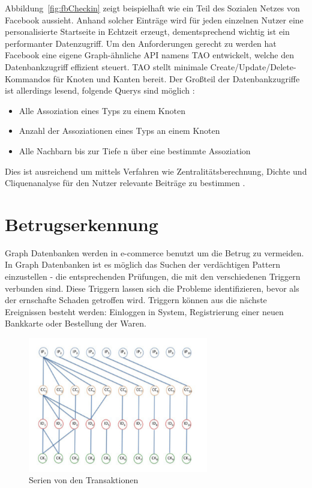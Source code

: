 Abbildung~\ref{fig:fbCheckin} zeigt beispielhaft wie ein Teil des Sozialen Netzes von Facebook aussieht. Anhand solcher Einträge wird für jeden einzelnen Nutzer eine personalisierte Startseite in Echtzeit erzeugt, dementsprechend wichtig ist ein performanter Datenzugriff. Um den Anforderungen gerecht zu werden hat Facebook eine eigene Graph-ähnliche API namens TAO entwickelt, welche den Datenbankzugriff effizient steuert. TAO stellt minimale Create/Update/Delete-Kommandos für Knoten und Kanten bereit. Der Großteil der Datenbankzugriffe ist allerdings lesend, folgende Querys sind möglich \cite{facebookTao}:
\begin{itemize}
	\item Alle Assoziation eines Typs zu einem Knoten
	\item Anzahl der Assoziationen eines Typs an einem Knoten
	\item Alle Nachbarn bis zur Tiefe n über eine bestimmte Assoziation
\end{itemize}
Dies ist ausreichend um mittels Verfahren wie Zentralitätsberechnung, Dichte und Cliquenanalyse für den Nutzer relevante Beiträge zu bestimmen \cite{sozialeNetzwerkanalyse}.


\section{Betrugserkennung}
Graph Datenbanken werden in e-commerce benutzt um die Betrug zu vermeiden. In Graph Datenbanken ist es möglich das Suchen der verdächtigen Pattern einzustellen - die entsprechenden Prüfungen, die mit den verschiedenen Triggern verbunden sind. Diese Triggern lassen sich die Probleme identifizieren, bevor als der ernschafte Schaden getroffen wird. Triggern können aus die nächste Ereignissen besteht werden: Einloggen in System, Registrierung einer neuen Bankkarte oder Bestellung der Waren.

\begin{figure}
	\caption{Serien von den Transaktionen}
	\label{fig:Trs}
	\centering
	\includegraphics[width=0.7\textwidth]{images/Betrugserkennung.png}
\end{figure}

